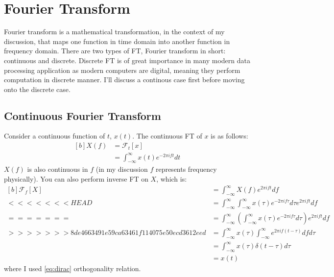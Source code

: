 \documentclass[letterpaper, 11pt]{article}
\newcommand{\fourier}[2]{\mathcal{F}_{#1}[#2]} %
\newcommand{\fint}{\int_{-\infty}^{\infty}} %
\newcommand{\ft}[2]{\fint #2 e^{-2\pi if#1} d#1} %
\newcommand{\ift}[2]{\fint #2 e^{2\pi i#1t} d#1} %
\numberwithin{equation}{section}
\begin{document}
\section{Fourier Transform}
Fourier transform is a mathematical transformation, in the context of my discussion, that maps one function in time domain into another function in frequency domain. There are two types of FT, Fourier transform in short: continuous and discrete. Discrete FT is of great importance in many modern data processing application as modern computers are digital, meaning they perform computation in discrete manner. I'll discuss a continous case first before moving onto the discrete case.

\subsection{Continuous Fourier Transform}
Consider a continuous function of \(t\), \(x(t)\). The continuous FT of \(x\) is as follows:
\begin{equation}
	\begin{aligned}[b]
		X(f)	&=\fourier{t}{x} \\
			&=\ft{t}{x(t)}
	\end{aligned}
\end{equation}
\(X(f)\) is also continuous in \(f\) (in my discussion \(f\) represents frequency physically). You can also perform inverse FT on \(X\), which is:
\begin{equation}
	\begin{aligned}[b]
		\fourier{f}{X}	&= \ift{f}{X(f)} \\
<<<<<<< HEAD
				&= \ift{f}{\ft{\tau}{x(\tau)}}\\
=======
				&= \ift{f}{\left ( \ft{\tau}{x(\tau)}\right )} \\
>>>>>>> 8de4663491e59ca63461f114075e50ecd3612eed
				&= \fint x(\tau) \fint e^{2\pi if(t - \tau)} df d\tau \\
				&= \fint x(\tau) \delta (t - \tau) d\tau \\
				&= x(t)
	\end{aligned}
\end{equation}
where I used \eqref{eq:dirac} orthogonality relation.
\end{document}
